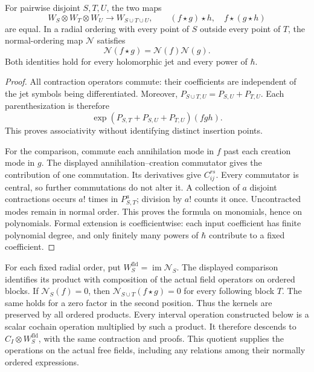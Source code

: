 \begin{proposition}
\label{prop:interval-wick-associativity}
For pairwise disjoint $S,T,U$, the two maps
\[
 W_S\otimes W_T\otimes W_U\longrightarrow W_{S\cup T\cup U},
 \qquad (f\star g)\star h,\quad f\star(g\star h)
\]
are equal.  In a radial ordering with every point of $S$ outside every
point of $T$, the normal-ordering map $\mathcal N$ satisfies
\[
 \mathcal N(f\star g)=\mathcal N(f)\mathcal N(g).
\]
Both identities hold for every holomorphic jet and every power of $\hbar$.
\end{proposition}
\begin{proof}
All contraction operators commute: their coefficients are independent of
the jet symbols being differentiated.  Moreover,
$P_{S\cup T,U}=P_{S,U}+P_{T,U}$.  Each parenthesization is therefore
\[
 \exp(P_{S,T}+P_{S,U}+P_{T,U})(fgh).
\]
This proves associativity without identifying distinct insertion points.

For the comparison, commute each annihilation mode in $f$ past each
creation mode in $g$.  The displayed annihilation--creation commutator
gives the contribution of one commutation.  Its derivatives give
$C_{ij}^{rs}$.  Every commutator is central, so further commutations do not
alter it.  A collection of $a$ disjoint contractions occurs $a!$ times in
$P_{S,T}^a$; division by $a!$ counts it once.  Uncontracted modes remain
in normal order.  This proves the formula on monomials, hence on
polynomials.  Formal extension is coefficientwise: each input coefficient
has finite polynomial degree, and only finitely many powers of $\hbar$
contribute to a fixed coefficient.
\end{proof}

For each fixed radial order, put $W_S^{\mathrm{fld}}=\operatorname{im}\mathcal N_S$.
The displayed comparison identifies its product with composition of the
actual field operators on ordered blocks.  If $\mathcal N_S(f)=0$, then
$\mathcal N_{S\cup T}(f\star g)=0$ for every following block $T$.
The same holds for a zero factor in the second position.
Thus the kernels are preserved by all ordered products.  Every interval
operation constructed below is a scalar cochain operation multiplied by
such a product.  It therefore descends to
$C_I\otimes W_S^{\mathrm{fld}}$, with the same contraction and proofs.
This quotient supplies the operations on the actual free fields, including
any relations among their normally ordered expressions.

